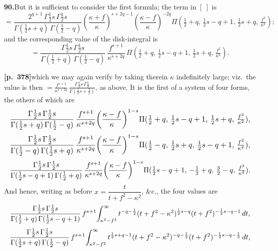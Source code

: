 \documentclass[11pt]{article}
\begin{document}
\bigskip

\noindent\textbf{90.}\quad But it is sufficient to consider the first formula; the term in $[\ ]$ is
\[
= \frac{2^{q+1}\,\Gamma\tfrac{1}{2}s\,\Gamma\tfrac{1}{2}s}{\Gamma(\tfrac{1}{2}s+q)\,\Gamma(\tfrac{1}{2}-q)}\!\left(\frac{\kappa+f}{\kappa}\right)^{s+2q-1}\!\left(\frac{\kappa-f}{\kappa}\right)^{-2q}\!\Pi(\tfrac{1}{2}+q,\,\tfrac{1}{2}s-q+1,\,\tfrac{1}{2}s+q,\,\tfrac{f^{2}}{\kappa^{2}});
\]
and the corresponding value of the disk-integral is
\[
= \frac{\Gamma\tfrac{1}{2}s\,\Gamma\tfrac{1}{2}s}{\Gamma(\tfrac{1}{2}+q)\,\Gamma(\tfrac{1}{2}-q)}\,\frac{f^{s+1}}{\kappa^{s+2q}}\,\Pi(\tfrac{1}{2}+q,\,\tfrac{1}{2}s-q+1,\,\tfrac{1}{2}s+q,\,\tfrac{f^{2}}{\kappa^{2}}).
\]

\bigskip

\noindent\textbf{[p.~378]}\quad which we may again verify by taking therein $\kappa$ indefinitely large; viz.\ the value is then $\displaystyle =\frac{f^{s+1}}{\kappa^{s+2q}}\,\frac{\Gamma\tfrac{1}{2}s\,\Gamma\tfrac{1}{2}}{\Gamma(\tfrac{1}{2}s+\tfrac{3}{2})}$, as above. It is the first of a system of four forms, the others of which are
\[
\resizebox{\textwidth}{!}{$\displaystyle
\frac{\Gamma\tfrac{1}{2}s\,\Gamma\tfrac{1}{2}s}{\Gamma(\tfrac{1}{2}s+q)\,\Gamma(\tfrac{1}{2}-q)}\,\frac{f^{s+1}}{\kappa^{s+2q}}\!\left(\frac{\kappa-f}{\kappa}\right)^{1-s}\!\Pi(\tfrac{1}{2}+q,\,\tfrac{1}{2}s-q+1,\,\tfrac{1}{2}s+q,\,\tfrac{f^{2}}{\kappa^{2}}),$}
\]
\[
\resizebox{\textwidth}{!}{$\displaystyle
\frac{\Gamma\tfrac{1}{2}s\,\Gamma\tfrac{1}{2}s}{\Gamma(\tfrac{1}{2}-q)\,\Gamma(\tfrac{1}{2}s+q)}\,\frac{f^{s+1}}{\kappa^{s+2q}}\!\left(\frac{\kappa-f}{\kappa}\right)^{1-s}\!\Pi(\tfrac{1}{2}-q,\,\tfrac{1}{2}s+q,\,\tfrac{1}{2}s-q+1,\,\tfrac{f^{2}}{\kappa^{2}}),$}
\]
\[
\resizebox{\textwidth}{!}{$\displaystyle
\frac{\Gamma\tfrac{1}{2}s\,\Gamma\tfrac{1}{2}s}{\Gamma(\tfrac{1}{2}s-q+1)\,\Gamma(\tfrac{1}{2}+q)}\,\frac{f^{s+1}}{\kappa^{s+2q}}\!\left(\frac{\kappa-f}{\kappa}\right)^{1-s}\!\Pi(\tfrac{1}{2}s-q+1,\,-\tfrac{1}{2}+q,\,\tfrac{3}{2}-q,\,\tfrac{f^{2}}{\kappa^{2}}).$}
\]
And hence, writing as before $x=\dfrac{t}{t+f^{2}-\kappa^{2}}$, \&c., the four values are
\[
\resizebox{\textwidth}{!}{$\displaystyle
\frac{\Gamma\tfrac{1}{2}s\,\Gamma\tfrac{1}{2}s}{\Gamma(\tfrac{1}{2}+q)\,\Gamma(\tfrac{1}{2}s-q+1)}\,f^{s+1}\!\int_{\kappa^{2}-f^{2}}^{\infty} t^{-q-\frac{1}{2}}(t+f^{2}-\kappa^{2})^{\frac{1}{2}s-q}(t+f^{2})^{-\frac{1}{2}s-q-1}\,dt,$}
\]
\[
\resizebox{\textwidth}{!}{$\displaystyle
\frac{\Gamma\tfrac{1}{2}s\,\Gamma\tfrac{1}{2}s}{\Gamma(\tfrac{1}{2}s+q)\,\Gamma(\tfrac{1}{2}-q)}\,f^{s+1}\!\int_{\kappa^{2}-f^{2}}^{\infty} t^{\frac{1}{2}s+q-1}(t+f^{2}-\kappa^{2})^{-q-\frac{1}{2}}(t+f^{2})^{-\frac{1}{2}s-q-\frac{1}{2}}\,dt,$}
\]
\end{document}
